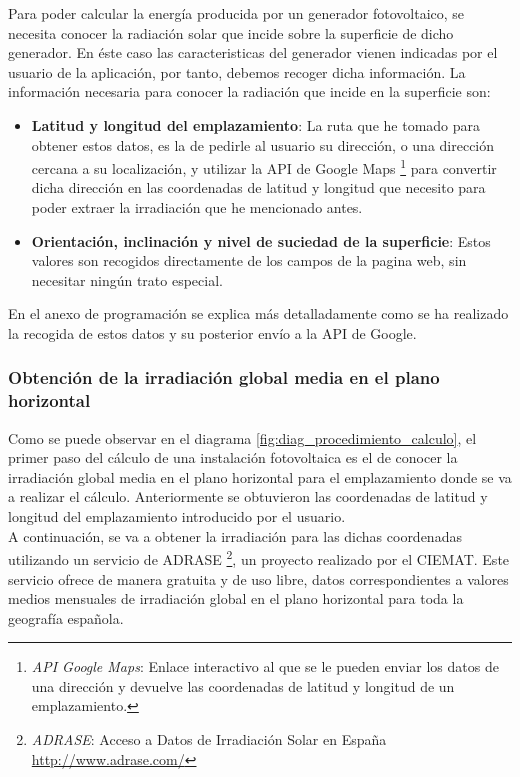 Para poder calcular la energía producida por un generador fotovoltaico, se necesita conocer la radiación solar que incide sobre la superficie de dicho generador. En éste caso las caracteristicas del generador vienen indicadas por el usuario de la aplicación, por tanto, debemos recoger dicha información. La información necesaria para conocer la radiación que incide en la superficie son:
\begin{itemize}
\item \textbf{Latitud y longitud del emplazamiento}: La ruta que he tomado para obtener estos datos, es la de pedirle al usuario su dirección, o una dirección cercana a su localización, y utilizar la API de Google Maps \footnote{\textit{API Google Maps}: Enlace interactivo al que se le pueden enviar los datos de una dirección y devuelve las coordenadas de latitud y longitud de un emplazamiento.  } para convertir dicha dirección en las coordenadas de latitud y longitud que necesito para poder extraer la irradiación que he mencionado antes.\\
\item \textbf{Orientación, inclinación y nivel de suciedad de la superficie}: Estos valores son recogidos directamente de los campos de la pagina web, sin necesitar ningún trato especial.
\end{itemize} 
En el anexo de programación se explica más detalladamente como se ha realizado la recogida de estos datos y su posterior envío a la API de Google.

\subsubsection{Obtención de la irradiación global media en el plano horizontal}
\label{section:get_global_rad}

Como se puede observar en el diagrama \ref{fig:diag_procedimiento_calculo}, el primer paso del cálculo de una instalación fotovoltaica es el de conocer la irradiación global media en el plano horizontal para el emplazamiento donde se va a realizar el cálculo. Anteriormente se obtuvieron las coordenadas de latitud y longitud del emplazamiento introducido por el usuario.\\

A continuación, se va a obtener la irradiación para las dichas coordenadas utilizando un servicio de ADRASE \footnote{\textit{ADRASE}: Acceso a Datos de Irradiación Solar en España \url{http://www.adrase.com/}}, un proyecto realizado por el CIEMAT. Este servicio ofrece de manera gratuita y de uso libre, datos correspondientes a valores medios mensuales de irradiación global en el plano horizontal para toda la geografía española.\\

